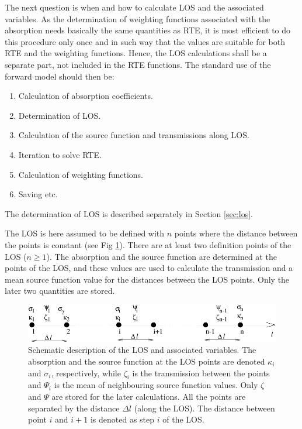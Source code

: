  The next question is when and how to calculate LOS and the associated
 variables. As the determination of weighting functions associated
 with the absorption needs basically the same
 quantities as RTE, it is most efficient to do this procedure only
 once and in such way that the values are suitable for both RTE and
 the weighting functions. Hence, the LOS calculations shall be a
 separate part, not included in the RTE functions. The standard use of
 the forward model should then be:
  \begin{enumerate}
    \item Calculation of absorption coefficients.
    \item Determination of LOS.
    \item Calculation of the source function and transmissions along LOS.
    \item Iteration to solve RTE.
    \item Calculation of weighting functions.
    \item Saving etc.
  \end{enumerate}
 The determination of LOS is described separately in Section \ref {sec:los}. 
  

  
 \label{sec:rte:iter}
 
 The LOS is here assumed to be defined with $n$ points where the
 distance between the points is constant (see Fig \ref{fig:rte:los}).
 There are at least two definition points of the LOS ($n\geq1$). The
 absorption and the source function are determined at the points of
 the LOS, and these values are used to calculate the transmission and a
 mean source function value for the distances between the LOS points.
 Only the later two quantities are stored.

  \begin{figure}
    \includegraphics*[width=0.98\hsize]{Figs/los}
    \caption{Schematic description of the LOS and associated variables.
      The absorption and the source function at the LOS points are
      denoted $\kappa_i$ and $\sigma_i$, respectively, while $\zeta_i$
      is the transmission between the points and $\Psi_i$ is the mean
      of neighbouring source function values. Only $\zeta$ and $\Psi$
      are stored for the later calculations. All the points are
      separated by the distance $\Delta l$ (along the LOS). The distance
      between point $i$ and $i+1$ is denoted as step $i$ of the LOS. }
    \label{fig:rte:los}  
  \end{figure}

